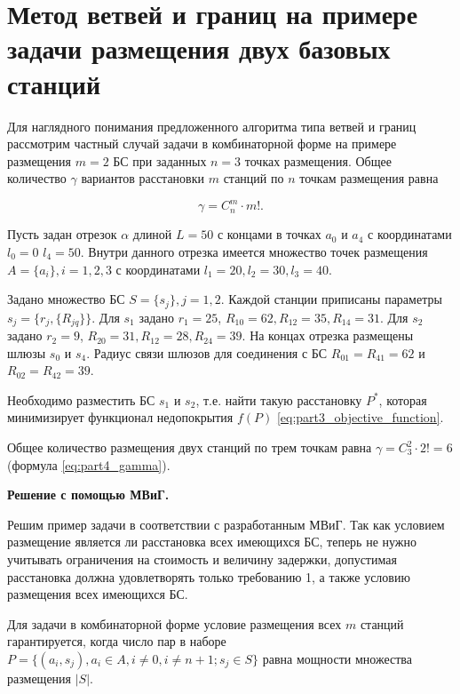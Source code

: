
\FloatBarrier
\section{Метод ветвей и границ на примере задачи размещения двух базовых станций}\label{part4:bnb_algorithm}

Для наглядного понимания предложенного алгоритма типа ветвей и границ рассмотрим частный случай задачи в комбинаторной форме на примере размещения $m = 2$ БС при заданных $n = 3$ точках размещения.  Общее количество $\gamma$ вариантов расстановки $m$ станций по $n$ точкам размещения равна 

\begin{equation}
  \label{eq:part4_gamma}
  \gamma = C^m_n \cdot m! .
\end{equation}



Пусть задан отрезок $\alpha$ длиной $L = 50$ с концами в точках $a_0$ и $a_4$ с координатами $l_0 = 0$ $l_4 = 50$. Внутри данного отрезка имеется множество точек размещения $A = \{a_i\}, i = 1, 2, 3$ с координатами $l_1 = 20, l_2 = 30, l_3 = 40$. 

Задано множество БС $S = \{ s_j \} , j = 1, 2$. Каждой станции приписаны параметры $s_j = \{ r_j, \{R_{jq}\}\}$.  Для $s_1$ задано $r_1 = 25$, $R_{10} = 62, R_{12} = 35, R_{14} = 31$. Для $s_2$ задано $r_2 = 9$, $R_{20} = 31, R_{12} = 28, R_{24} = 39$.
На концах отрезка размещены шлюзы $s_0$ и $s_4$. Радиус связи шлюзов для соединения с БС $R_{01} = R_{41} = 62$ и $R_{02} = R_{42} = 39$. 


Необходимо разместить БС $s_1$ и $s_2$, т.е. найти такую расстановку $P^*$, которая минимизирует функционал недопокрытия $f(P)$ \cref{eq:part3_objective_function}.

Общее количество размещения двух станций по трем точкам равна $\gamma = C^2_3 \cdot 2! = 6$ (формула \cref{eq:part4_gamma}).

\textbf{Решение с помощью МВиГ.}

Решим пример задачи в соответствии с разработанным МВиГ. Так как  условием размещение является ли расстановка всех имеющихся БС, теперь не нужно учитывать ограничения на стоимость и величину задержки, допустимая расстановка должна удовлетворять только требованию 1, а также условию размещения всех имеющихся БС.

Для задачи в комбинаторной форме условие размещения всех $m$ станций гарантируется, когда число пар в наборе $P = \{ (a_i, s_j), a_i \in A, i \neq 0, i \neq n + 1; s_j \in S\}$ равна мощности множества размещения $|S|$. 

